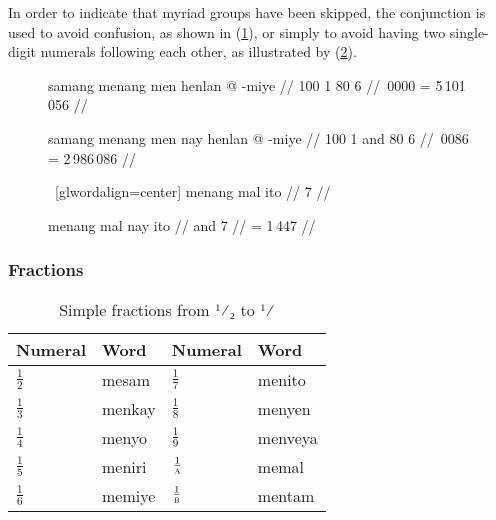 In order to indicate that myriad groups have been skipped, the conjunction
 is used to avoid confusion, as shown in
(\ref{ex:numconfuse}), or simply to avoid having two single-digit numerals
following each other, as illustrated by (\ref{ex:numsgldig}).

\begin{figure}[h]
\pex[glwordalign=center]\label{ex:numconfuse}
\a\begingl
	\gla samang menang men henlan @ -miye //
	 {100} {1} {80} {6} //
	\,0000 = 5\,101\,056 //
\endgl

\a\begingl
	\gla samang menang men nay henlan @ -miye //
	 {100} {1} and {80} {6} //
	\,0086 = 2\,986\,086 //
\endgl
\xe
\end{figure}

\begin{figure}[h]
\pex~[glwordalign=center]\label{ex:numsgldig}
\a\ljudge\ques\begingl
	\gla menang mal ito //
	 {\ten} {7} //
\endgl

\a\begingl
	\gla menang mal nay ito //
	 {\ten} and {7} //
	\glft {} = 1\,447 //
\endgl
\xe
\end{figure}

\subsubsection{Fractions}

\begin{table}[p]\centering
\caption[Simple fractions from $\frac{1}{2}$ to $\frac{1}{\elv}$]{Simple 
fractions from ¹⁄₂ to ¹⁄\tsub{\elv}}
\begin{tabu} to .75\linewidth {X[c] I X[c] I}
\toprule\tableheaderfont
Numeral
	& Word
	& Numeral
	& Word
	\\
\toprule

$\frac{1}{2}$
	& mesam %
	& $\frac{1}{7}$
	& menito %
	\\ [.25\baselineskip]

$\frac{1}{3}$
	& menkay %
	& $\frac{1}{8}$
	& menyen %
	\\ [.25\baselineskip]

$\frac{1}{4}$
	& menyo %
	& $\frac{1}{9}$
	& menveya %
	\\ [.25\baselineskip]

$\frac{1}{5}$
	& meniri %
	& $\frac{1}{\textsc{a}}$
	& memal %
	\\ [.25\baselineskip]

$\frac{1}{6}$
	& memiye %
	& $\frac{1}{\elv}$
	& mentam %
	\\

\bottomrule
\end{tabu}
\label{tab:smallfrac}
\end{table}

